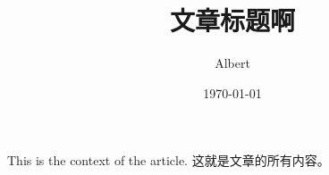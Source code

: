 \documentclass[UTF8]{ctexart}
\title{文章标题啊}
\author{Albert}
\date{\today}
\begin{document}
\maketitle

This is the context of the article.
这就是文章的所有内容。
\end{document}

